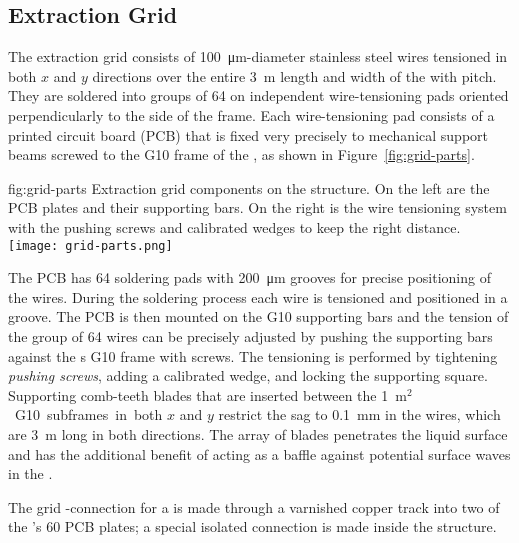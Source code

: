 \subsection{Extraction Grid}
\label{sec:fddp-crp-grid}
The extraction grid consists of \SI{100}{\micro\meter}-diameter stainless steel wires tensioned in both $x$ and $y$ directions over the entire \SI{3}{m} length and width of the  with \dpstrippitch pitch. They are soldered into groups of \num{64} on independent wire-tensioning pads oriented perpendicularly to the side of the  frame. Each wire-tensioning pad consists of a printed circuit board (PCB)  that is fixed very precisely to mechanical support beams screwed to the G10 frame of the , as shown in Figure~\ref{fig:grid-parts}.
 
\begin{dunefigure}{fig:grid-parts}
{Extraction grid components on the  structure. On the left are the PCB plates and their supporting bars. On the right is the %
wire tensioning system with the pushing screws and calibrated wedges to keep the right distance.}
\texttt{[image: grid-parts.png]}
\end{dunefigure}

The PCB has \num{64} soldering pads with \SI{200}{\micro\meter} grooves for precise positioning of the wires. During the %
soldering process each wire is tensioned and positioned in a groove. The PCB is then mounted on the G10 supporting bars and the tension of the group of \num{64} wires can be precisely adjusted by pushing the supporting bars against the s G10 frame with screws. The tensioning is performed by tightening \textit{pushing screws}, adding a calibrated wedge, and locking the supporting square.
Supporting comb-teeth blades that are inserted between the \SI{1}{m$^2$} G10 subframes in both $x$ and $y$ restrict the sag to \SI{0.1}{mm} in the wires, which are \SI{3}{m} long in both directions. The array of blades penetrates the liquid surface and has the additional benefit of acting as a baffle against potential surface waves in the \lar.

The grid -connection for a  is made through a varnished copper track into two of the 's \num{60} PCB plates; a special isolated connection %
is made inside the  structure.

